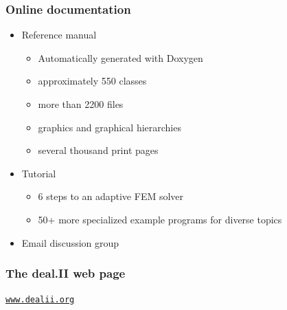 \begin{frame}
  \frametitle{Online documentation}
  \begin{itemize}
  \item Reference manual
    \begin{itemize}
    \item Automatically generated with Doxygen
    \item approximately 550 classes
    \item more than 2200 files
    \item graphics and graphical hierarchies
    \item several thousand print pages
    \end{itemize}
  \item Tutorial
    \begin{itemize}
    \item 6 steps to an adaptive FEM solver
    \item 50+ more specialized example programs for diverse topics
    \end{itemize}
  \item Email discussion group
  \end{itemize}
\end{frame}

\begin{frame}
  \frametitle{The deal.II web page}
  \begin{center}
    \texttt{\Large\href{http://www.dealii.org}{www.dealii.org}}
  \end{center}
\end{frame}

